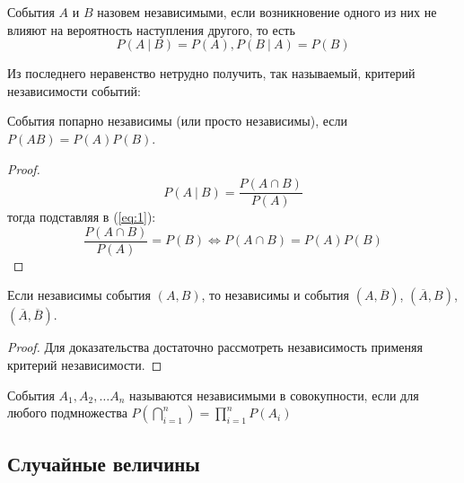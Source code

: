 \begin{definition}
    События $A$ и $B$ назовем независимыми, если возникновение
    одного из них не влияют на вероятность наступления другого, то
    есть 
    \begin{equation}
        P(A ~|~ B) = P(A), P(B ~|~ A) = P(B) \label{eq:1}
    \end{equation}
\end{definition}
Из последнего неравенство нетрудно получить, так называемый, критерий
независимости событий:
\begin{theorem}
    События попарно независимы (или просто независимы), если $P(AB) = P(A)P(B)$.
\end{theorem}
\begin{proof}
    \begin{equation*}
        P(A ~|~ B) = \frac{P(A \cap B)}{P(A)}
    \end{equation*}
    тогда подставляя в (\ref{eq:1}):
    \begin{equation*}
        \frac{P(A \cap B)}{P(A)} = P(B) \Leftrightarrow 
        P(A \cap B) = P(A)P(B)
    \end{equation*}
\end{proof}

\begin{theorem}
    Если независимы события $(A, B)$, то независимы и события $(A, \overline{B})$, $(\overline{A}, B)$, ${(\overline{A}, \overline{B})}$.
\end{theorem}
\begin{proof}
    Для доказательства достаточно рассмотреть независимость применяя критерий независимости.
\end{proof}

\begin{definition}
    События $A_1, A_2, \dots A_n$ называются независимыми в совокупности, если
    для любого подмножества $\displaystyle P(\bigcap\limits_{i = 1}^n) = \prod\limits_{i = 1}^n P(A_i)$ 
\end{definition}

\subsection{Случайные величины}

